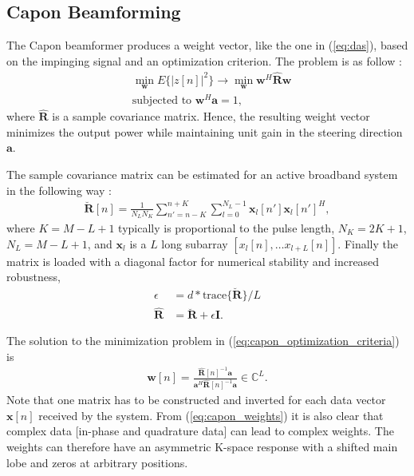 \documentclass[draftcls]{IEEEtran}
\newcommand{\mat}[1]{\mathbf{#1}}
\renewcommand{\vec}[1]{\mathbf{#1}}
\begin{document}
\subsection{Capon Beamforming}
The Capon beamformer produces a weight vector, like the one in (\ref{eq:das}), based on the impinging signal and an optimization criterion. The problem is as follow \cite{Capon1969}:
\begin{align}
&\min_{\vec{w}} E\{|z[n]|^2\} \rightarrow \min_{\vec{w}} \vec{w}^H \mat{\hat{R}} \vec{w} \label{eq:capon_optimization_criteria} \\
&\text{subjected to } \vec{w}^H\vec{a} = 1,
\end{align}
where $\mat{\hat{R}}$ is a sample covariance matrix. Hence, the resulting weight vector minimizes the output power while maintaining unit gain in the steering direction $\vec{a}$. %

The sample covariance matrix can be estimated for an active broadband system in the following way \cite{Synnevag2009}:
\begin{align}
\mat{\breve{R}}[n] = \frac{1}{N_LN_K}\sum_{n'=n-K}^{n+K} \sum_{l=0}^{N_L-1} \vec{x}_l[n']\vec{x}_l[n']^H,
\end{align}
where $K = M-L+1$ typically is proportional to the pulse length, $N_K = 2K + 1$, $N_L = M-L+1$, and $\vec{x}_l$ is a $L$ long subarray $[x_l[n], \dotso x_{l+L}[n]]$. Finally the matrix is loaded with a diagonal factor for numerical stability and increased robustness, 
\begin{align}
\epsilon &= d*\text{trace}\{\mat{\breve{R}}\}/L\\
\mat{\hat{R}} &= \mat{\breve{R}} + \epsilon\mat{I}.
\end{align} 

The solution to the minimization problem in (\ref{eq:capon_optimization_criteria}) is
\begin{align}\label{eq:capon_weights}
\vec{w}[n] = \frac{\mat{\hat{R}}[n]^{-1}\vec{a}}{\vec{a}^H\mat{\hat{R}}[n]^{-1}\vec{a}} \in \mathbb{C}^L.
\end{align}
Note that one matrix has to be constructed and inverted for each data vector $\vec{x}[n]$ received by the system. %
From (\ref{eq:capon_weights}) it is also clear that complex data [in-phase and quadrature data] can lead to complex weights. The weights can therefore have an asymmetric K-space response with a shifted main lobe and zeros at arbitrary positions. %
\end{document}
